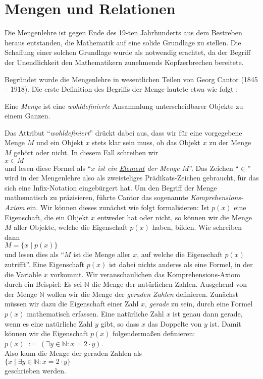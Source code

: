 \section{Mengen und Relationen}
Die Mengenlehre ist gegen Ende des 19-ten Jahrhunderts aus dem Bestreben heraus
entstanden, die Mathematik auf eine solide Grundlage zu stellen.  Die Schaffung einer
solchen Grundlage wurde als notwendig erachtet, da der Begriff der Unendlichkeit den
Mathematikern zunehmends Kopfzerbrechen bereitete.

Begründet wurde die Mengenlehre in wesentlichen Teilen von Georg Cantor (1845 -- 1918).
Die erste Definition des Begriffs der Menge lautete etwa wie folgt \cite{cantor:1895}:
\begin{center}
Eine \emph{Menge} ist eine \emph{wohldefinierte} Ansammlung unterscheidbarer Objekte zu
  einem Ganzen.
\end{center}
Das Attribut ``\emph{wohldefiniert}'' drückt dabei aus, dass wir für 
eine vorgegebene Menge $M$ und ein Objekt $x$ stets klar sein muss, ob das Objekt $x$
zu der Menge $M$ gehört oder nicht.  In diesem Fall schreiben wir \\[0.2cm]
\hspace*{1.3cm} $x \in M$ \\[0.2cm]
und lesen diese Formel als ``\emph{$x$ ist ein \underline{Element} der Menge $M$}''.
Das Zeichen ``$\in$'' wird in der Mengenlehre also als zweisteliges Prädikats-Zeichen
gebraucht, für das sich eine Infix-Notation eingebürgert hat.
Um den Begriff der Menge mathematisch zu
präzisieren, führte Cantor das sogenannte \emph{Komprehensions-Axiom} ein.
Wir können dieses zunächst wie folgt formalisieren: Ist $p(x)$ eine Eigenschaft, die
ein Objekt $x$ entweder hat oder nicht, so können wir die Menge $M$ aller Objekte, welche die
Eigenschaft $p(x)$ haben, bilden.  Wie schreiben dann \\[0.2cm]
\hspace*{1.3cm} $M = \{ x \;|\; p(x) \}$ \\[0.2cm]
und lesen dies als ``$M$ ist die Menge aller $x$, auf welche die Eigenschaft $p(x)$ zutrifft''.
Eine Eigenschaft $p(x)$ ist dabei nichts anderes als eine Formel, in der die Variable $x$
vorkommt.
Wir veranschaulichen das Komprehensions-Axiom durch ein Beispiel:  Es sei $\mathbb{N}$
die Menge der natürlichen Zahlen. Ausgehend von der Menge $\mathbb{N}$  wollen wir die
Menge der \emph{geraden Zahlen} definieren. Zunächst müssen wir dazu die Eigenschaft einer
Zahl $x$,
\emph{gerade} zu sein, durch eine Formel $p(x)$ mathematisch erfassen.  Eine natürliche Zahl $x$ ist
genau dann gerade, wenn es eine natürliche Zahl $y$ gibt, so dass $x$ das Doppelte von $y$
ist.  Damit können wir die Eigenschaft $p(x)$ folgendermaßen
definieren: \\[0.2cm]
\hspace*{1.3cm} $p(x) \;:=\; (\exists y\in \mathbb{N}: x = 2 \cdot y)$. \\[0.2cm]
Also kann die Menge der geraden Zahlen als \\[0.2cm]
\hspace*{1.3cm} $\{ x \;|\; \exists y\in \mathbb{N}: x = 2 \cdot y \}$ \\[0.2cm]
geschrieben werden.

